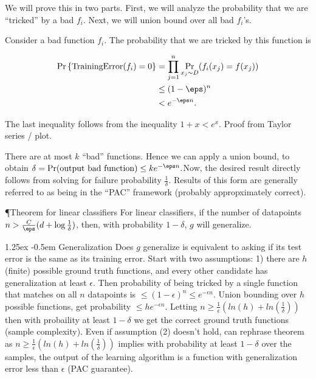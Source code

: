 \documentclass[8pt]{article}
\makeatletter
\newlength{\norm}
\newlength{\nrm}
\renewcommand{\paragraph}{%
  \@startsection{paragraph}{4}%
  {\z@}{1.25ex \@plus 2pt \@minus 2pt}{-0.5em}%
  {\fontsize{\f@size}{\nrm}\normalfont\bfseries}%
}
\makeatother
\begin{document}
{\begin{multicols*}{5}
  We will prove this in two parts. First, we will analyze the probability that we are ``tricked'' by a bad $f_i$. Next, we will union bound over all bad $f_i$'s.

  Consider a bad function $f_i$.  The probability that we are tricked by this function is 

  \begin{align*}
   \Pr\left\{ \text{TrainingError}(f_i) = 0 \right\} &= \prod_{j=1}^{n} \Pr_{x_j \sim D} (f_i(x_j) = f(x_j)) \\
   & \leq (1-\eps)^{n} \\
   & < e^{- \eps n}.
  \end{align*}

  The last inequality follows from the inequality $1 + x < e^{x}$.  Proof from Taylor series / plot.

  There are at most $k$ ``bad'' functions.  Hence we can apply a union bound, to obtain $\delta = \Pr(\text{output bad function}) \leq k e^{-\eps n}.$Now, the desired result directly follows from solving for failure probability $\frac{1}{\delta}$. Results of this form are generally referred to as being in the ``PAC'' framework (probably appropximately correct).

  \P{Theorem for linear classifiers} For linear classifiers, if the number of datapoints $n > \frac{C}{\eps} (d + \log \frac{1}{\delta})$, then, with probability $1 - \delta$, $g$ will generalize.


\paragraph{Generalization} Does $g$ generalize is equivalent to asking if its test error is the same as its training error. Start with two assumptions: 1) there are $h$ (finite) possible ground truth functions, and every other candidate has generalization at least $\epsilon$. Then probability of being tricked by a single function that matches on all $n$ datapoints is $\leq (1 - \epsilon)^n \leq e^{-\epsilon n}$. Union bounding over $h$ possible functions, get probability $\leq he^{-\epsilon n}$. Letting $n \geq \frac{1}{\epsilon}(ln(h) + ln(\frac{1}{\delta}))$ then with probaility at least $1 - \delta$ we get the correct ground truth functions (sample complexity). Even if assumption (2) doesn't hold, can rephrase theorem as $n \geq \frac{1}{\epsilon}(ln(h) + ln(\frac{1}{\delta}))$ implies with probability at least $1 - \delta$ over the samples, the output of the learning algorithm is a function with generalization error less than $\epsilon$ (PAC guarantee). \\


\end{multicols*}}
\end{document}
